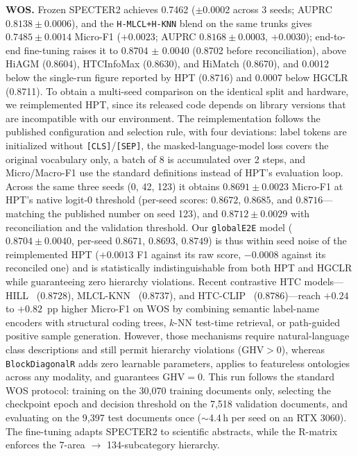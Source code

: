 \documentclass[preprint,12pt]{elsarticle}
\begin{document}
\textbf{WOS.} Frozen SPECTER2 achieves 0.7462 ($\pm$0.0002 across 3
seeds; AUPRC $0.8138 \pm 0.0006$), and the \texttt{H-MLCL+H-KNN} blend on
the same trunks gives $0.7485 \pm 0.0014$ Micro-F1 ($+0.0023$; AUPRC
$0.8168 \pm 0.0003$, $+0.0030$);
end-to-end fine-tuning raises it to 0.8704 $\pm$ 0.0040 (0.8702 before
reconciliation), above HiAGM (0.8604), HTCInfoMax (0.8630), and
HiMatch (0.8670), and 0.0012 below the single-run figure reported by
HPT (0.8716) and 0.0007 below HGCLR (0.8711). To obtain a
multi-seed comparison on the identical split and hardware, we
reimplemented HPT, since its released code depends on library versions
that are incompatible with our environment. The reimplementation follows
the published configuration and selection rule, with four deviations:
label tokens are initialized without \texttt{[CLS]}/\texttt{[SEP]}, the
masked-language-model loss covers the original vocabulary only, a batch
of 8 is accumulated over 2 steps, and Micro/Macro-F1 use the standard
definitions instead of HPT's evaluation loop. Across the same three
seeds (0, 42, 123) it obtains $0.8691 \pm 0.0023$ Micro-F1 at HPT's
native logit-0 threshold (per-seed scores: $0.8672$, $0.8685$, and
$0.8716$---matching the published number on seed 123), and
$0.8712 \pm 0.0029$ with reconciliation and the validation threshold.
Our \texttt{globalE2E} model ($0.8704 \pm 0.0040$,
per-seed $0.8671$, $0.8693$, $0.8749$) is thus within seed noise of the
reimplemented HPT ($+0.0013$ F1 against its raw score, $-0.0008$ against
its reconciled one) and is statistically indistinguishable from both
HPT and HGCLR while guaranteeing zero hierarchy violations. Recent
contrastive HTC models---HILL~\cite{hill2024} ($0.8728$),
MLCL-KNN~\cite{mlclknn2024} ($0.8737$), and HTC-CLIP~\cite{htcclip2023}
($0.8786$)---reach $+0.24$ to $+0.82$~pp higher Micro-F1 on WOS by combining
semantic label-name encoders with structural coding trees, $k$-NN test-time
retrieval, or path-guided positive sample generation. However, those
mechanisms require natural-language class descriptions and still permit
hierarchy violations ($\text{GHV}>0$), whereas \texttt{BlockDiagonalR} adds zero
learnable parameters, applies to featureless ontologies across any modality, and
guarantees $\text{GHV}=0$. This run
follows the standard WOS protocol: training on the 30,070 training
documents only, selecting the checkpoint epoch and decision threshold on
the 7,518 validation documents, and evaluating on the 9,397 test
documents once ($\sim$4.4\,h per seed on an RTX 3060). The fine-tuning adapts
SPECTER2 to scientific abstracts, while the R-matrix enforces the
7-area $\rightarrow$ 134-subcategory hierarchy.
\end{document}
